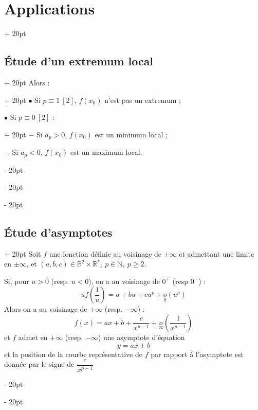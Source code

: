 \documentclass[a4paper, 12pt, twoside]{article}
\newcommand{\N}{\mathbb{N}} %
\newcommand{\R}{\mathbb{R}} %
\newcommand{\lr}[1]{\left( #1 \right)}
\renewcommand{\ge}{\geqslant}
\newcommand{\ind}[1][20pt]{\advance\leftskip + #1}
\newcommand{\deind}[1][20pt]{\advance\leftskip - #1}
\newenvironment{indt}[2][20pt]{#2 \par \ind[#1]}{\par \deind} %
\begin{document}
\begin{indt}{\section{Applications}}
\begin{indt}{\subsection{\'Etude d'un extremum local}}
            \begin{indt}{Alors :}
                $\bullet$ Si $p \equiv 1\ [2]$, $f(x_0)$ n'est pas un extremum ;
                
                \begin{indt}{$\bullet$ Si $p \equiv 0\ [2]$ :}
                    $-$ Si $a_p > 0$, $f(x_0)$ est un minimum local ;
                    
                    $-$ Si $a_p < 0$, $f(x_0)$ est un maximum local.
                \end{indt}
            \end{indt}
        \end{indt}
        
        \vspace{12pt}
        
        \begin{indt}{\subsection{\'Etude d'asymptotes}}
            Soit $f$ une fonction définie au voisinage de $\pm \infty$ et admettant une limite en $\pm \infty$, et $(a, b, c) \in \R^2 \times \R^*,\ p \in \N,\ p \ge 2$.
            
            \vspace{6pt}
            
            Si, pour $u > 0$ (resp. $u < 0$), on a au voisinage de $0^+$ (resp $0^-$) :
                \[ uf\!\lr{\dfrac 1 u} = a + bu + cu^p + \underset{0}{o}(u^p) \]
            Alors on a au voisinage de $+\infty$ (resp. $-\infty$) :
                \[ f(x) = ax + b + \dfrac{c}{x^{p - 1}} + \underset{\infty}{o}\!\lr{\dfrac{1}{x^{p - 1}}} \]
            et $f$ admet en $+\infty$ (resp. $-\infty$) une asymptote d'équation
                \[ y = ax + b \]
            et la position de la courbe représentative de $f$ par rapport à l’asymptote est donnée par le signe de $\dfrac{c}{x^{p - 1}}$

        \end{indt}
        
    \end{indt}
    
    \vspace{12pt}
    
\end{document}
